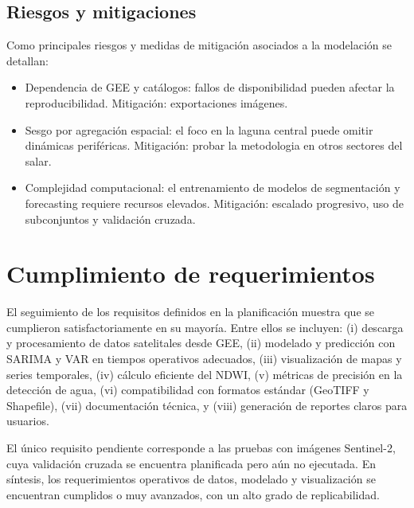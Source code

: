 \subsection{Riesgos y mitigaciones}
Como principales riesgos y medidas de mitigación asociados a la modelación se detallan:
\begin{itemize}
    \item Dependencia de GEE y catálogos: fallos de disponibilidad pueden afectar la reproducibilidad. Mitigación: exportaciones imágenes.
    \item Sesgo por agregación espacial: el foco en la laguna central puede omitir dinámicas periféricas. Mitigación: probar la metodologia en otros sectores del salar.
     \item Complejidad computacional: el entrenamiento de modelos de segmentación y forecasting requiere recursos elevados. Mitigación: escalado progresivo, uso de subconjuntos y validación cruzada.
\end{itemize}



\section{Cumplimiento de requerimientos}

El seguimiento de los requisitos definidos en la planificación muestra que se cumplieron satisfactoriamente en su mayoría. Entre ellos se incluyen: (i) descarga y procesamiento de datos satelitales desde GEE, (ii) modelado y predicción con SARIMA y VAR en tiempos operativos adecuados, (iii) visualización de mapas y series temporales, (iv) cálculo eficiente del NDWI, (v) métricas de precisión en la detección de agua, (vi) compatibilidad con formatos estándar (GeoTIFF y Shapefile), (vii) documentación técnica, y (viii) generación de reportes claros para usuarios. 

El único requisito pendiente corresponde a las pruebas con imágenes Sentinel-2, cuya validación cruzada se encuentra planificada pero aún no ejecutada. En síntesis, los requerimientos operativos de datos, modelado y visualización se encuentran cumplidos o muy avanzados, con un alto grado de replicabilidad.



